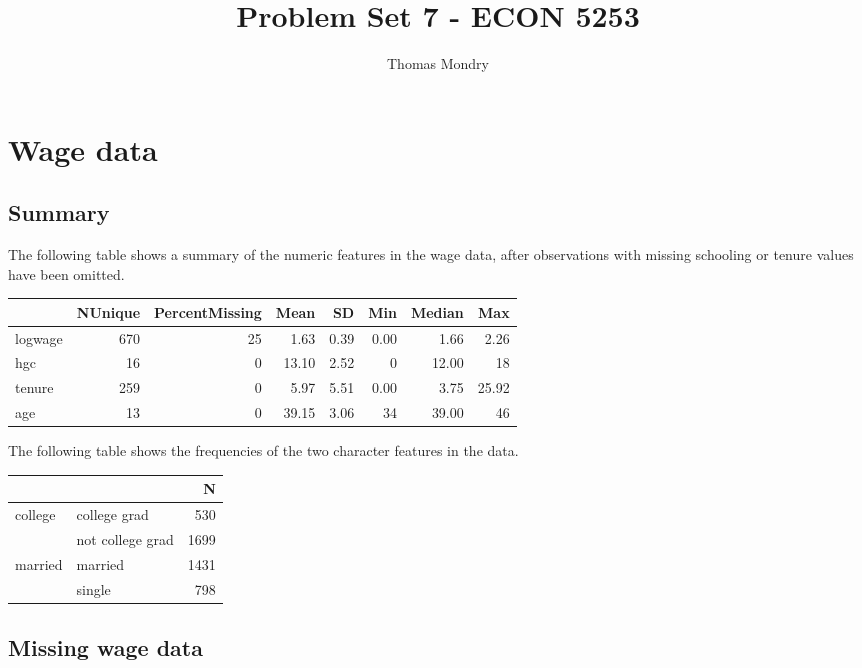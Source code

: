 \documentclass{article}
\title{Problem Set 7 - ECON 5253}
\author{Thomas Mondry}
\begin{document}
\maketitle

\section{Wage data}

\subsection{Summary}

The following table shows a summary of the numeric features in the wage data, after observations with missing schooling or tenure values have been omitted.

\begin{table}[H]
	\centering
	\begin{tabular}[t]{lrrrrrrr}
		\toprule
		& NUnique & PercentMissing & Mean & SD & Min & Median & Max\\
		\midrule
		logwage & 670 & 25 & 1.63 & 0.39 & 0.00 & 1.66 & 2.26\\
		hgc & 16 & 0 & 13.10 & 2.52 & 0 & 12.00 & 18\\
		tenure & 259 & 0 & 5.97 & 5.51 & 0.00 & 3.75 & 25.92\\
		age & 13 & 0 & 39.15 & 3.06 & 34 & 39.00 & 46\\
		\bottomrule
	\end{tabular}
\end{table}

The following table shows the frequencies of the two character features in the data.

\begin{table}[H]
	\centering
	\begin{tabular}[t]{llr}
		\toprule
		&    & N\\
		\midrule
		college & college grad & 530\\
		& not college grad & 1699\\
		married & married & 1431\\
		& single & 798\\
		\bottomrule
	\end{tabular}
\end{table}

\subsection{Missing wage data}
\end{document}
